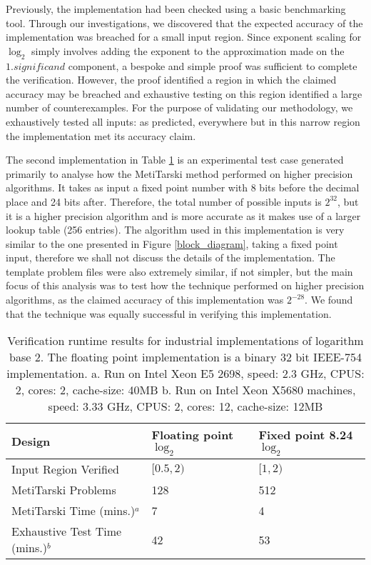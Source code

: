 \documentclass{fac}
\begin{document}
Previously, the implementation had been checked using a basic benchmarking tool. Through our investigations, we discovered that the expected accuracy of the implementation was breached for a small input region. Since exponent scaling for $\log_2$ simply involves adding the exponent to the approximation made on the $1.\textit{significand}$ component, a bespoke and simple proof was sufficient to complete the verification. However, the proof identified a region in which the claimed accuracy may be breached and exhaustive testing on this region identified a large number of counterexamples. For the purpose of validating our methodology, we exhaustively tested all inputs: as predicted, everywhere but in this narrow region the implementation met its accuracy claim.

The second implementation in Table \ref{result} is an experimental test case generated primarily to analyse how the MetiTarski method performed on higher precision algorithms. It takes as input a fixed point number with 8 bits before the decimal place and 24 bits after. Therefore, the total number of possible inputs is $2^{32}$, but it is a higher precision algorithm and is more accurate as it makes use of a larger lookup table (256 entries). The algorithm used in this implementation is very similar to the one presented in Figure \ref{block_diagram}, taking a fixed point input, therefore we shall not discuss the details of the implementation. The template problem files were also extremely similar, if not simpler, but the main focus of this analysis was to test how the technique performed on higher precision algorithms, as the claimed accuracy of this implementation was $2^{-28}$. We found that the technique was equally successful in verifying this implementation. 

\begin{table}
\begin{tabular}{lll}\toprule
Design & Floating point $\log_2$ & Fixed point 8.24 $\log_2$    \\
\midrule
 Input Region Verified& $[0.5,2)$ & $[1,2) $ \\ 
 MetiTarski Problems & 128 & 512 \\
 MetiTarski Time (mins.)$^a$ &  7 & 4 \\ 
 Exhaustive Test Time (mins.)$^b$ & 42 & 53 \\
\bottomrule
\end{tabular}
\caption{Verification runtime results for industrial implementations of logarithm base 2. The floating point implementation is a binary 32 bit IEEE-754 implementation.\newline
a. Run on Intel Xeon E5 2698, speed: 2.3 GHz, CPUS: 2, cores: 2, cache-size: 40MB
\newline
b. Run on Intel Xeon X5680 machines, speed: 3.33 GHz, CPUS: 2, cores: 12, cache-size: 12MB}\label{result}     
\end{table}
\end{document}
